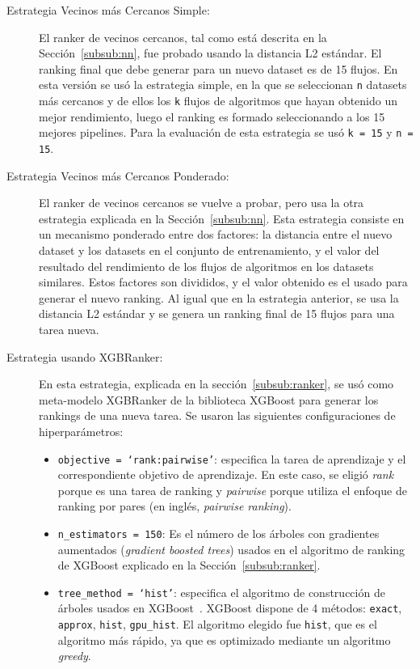 \begin{description}
	\item[Estrategia Vecinos más Cercanos Simple:] El ranker de vecinos cercanos, tal como está descrita en la Sección~\ref{subsub:nn}, fue probado usando la distancia L2 estándar. El ranking final que debe generar para un nuevo dataset es de 15 flujos. En esta versión se usó la estrategia simple, en la que se seleccionan \texttt{n} datasets más cercanos y de ellos los \texttt{k} flujos de algoritmos que hayan obtenido un mejor rendimiento, luego el ranking es formado seleccionando a los 15 mejores pipelines. Para la evaluación de esta estrategia se usó \texttt{k = 15} y \texttt{n = 15}.
	\item[Estrategia Vecinos más Cercanos Ponderado:] El ranker de vecinos cercanos se vuelve a probar, pero usa la otra estrategia explicada en la Sección~\ref{subsub:nn}. Esta estrategia consiste en un mecanismo ponderado entre dos factores: la distancia entre el nuevo dataset y los datasets en el conjunto de entrenamiento, y el valor del resultado del rendimiento de los flujos de algoritmos en los datasets similares. Estos factores son divididos, y el valor obtenido es el usado para generar el nuevo ranking. Al igual que en la estrategia anterior, se usa la distancia L2 estándar y se genera un ranking final de 15 flujos para una tarea nueva.
	\item[Estrategia usando  XGBRanker:] En esta estrategia, explicada en la sección~\ref{subsub:ranker}, se usó como meta-modelo XGBRanker de la biblioteca XGBoost para generar los rankings de una nueva tarea. Se usaron las siguientes configuraciones de hiperparámetros: 	
	\begin{itemize}
		\item \texttt{objective = `rank:pairwise'}: especifica la tarea de aprendizaje y el correspondiente objetivo de aprendizaje. En este caso, se eligió \textit{rank} porque es una tarea de ranking y \textit{pairwise} porque utiliza el enfoque de ranking por pares (en inglés, \textit{pairwise ranking}).
		\item \texttt{n\_estimators = 150}: Es el número de los árboles con gradientes aumentados (\textit{gradient boosted trees}) usados en el algoritmo de ranking de XGBoost explicado en la Sección~\ref{subsub:ranker}.
		\item \texttt{tree\_method = `hist'}: especifica el algoritmo de construcción de árboles usados en XGBoost~\cite{xgboost}. XGBoost dispone de 4 métodos: \texttt{exact}, \texttt{approx}, \texttt{hist}, \texttt{gpu\_hist}. El algoritmo elegido fue \texttt{hist}, que es el algoritmo más rápido, ya que es optimizado mediante un algoritmo \textit{greedy}.

\end{itemize}
\end{description}

